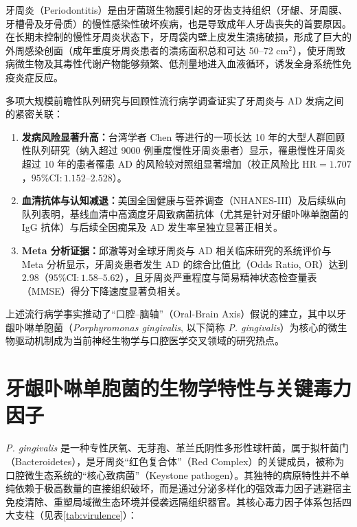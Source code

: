 \documentclass[12pt,a4paper]{ctexart}
\begin{document}
牙周炎（Periodontitis）是由牙菌斑生物膜引起的牙齿支持组织（牙龈、牙周膜、牙槽骨及牙骨质）的慢性感染性破坏疾病，也是导致成年人牙齿丧失的首要原因\cite{caocaifang2004}。在长期未控制的慢性牙周炎状态下，牙周袋内壁上皮发生溃疡破损，形成了巨大的外周感染创面（成年重度牙周炎患者的溃疡面积总和可达 50--72 $\text{cm}^2$），使牙周致病微生物及其毒性代谢产物能够频繁、低剂量地进入血液循环，诱发全身系统性免疫炎症反应\cite{zhangjing2017, liyihan2018}。

多项大规模前瞻性队列研究与回顾性流行病学调查证实了牙周炎与 AD 发病之间的紧密关联：
\begin{enumerate}
    \item \textbf{发病风险显著升高：}台湾学者 Chen 等\cite{chen2017}进行的一项长达 10 年的大型人群回顾性队列研究（纳入超过 9000 例重度慢性牙周炎患者）显示，罹患慢性牙周炎超过 10 年的患者罹患 AD 的风险较对照组显著增加（校正风险比 $\text{HR} = 1.707$，$95\%\text{CI}: 1.152\text{--}2.528$）。
    \item \textbf{血清抗体与认知减退：}美国全国健康与营养调查（NHANES-III）及后续纵向队列表明，基线血清中高滴度牙周致病菌抗体（尤其是针对牙龈卟啉单胞菌的 IgG 抗体）与后续全因痴呆及 AD 发生率呈独立显著正相关\cite{beydoun2020}。
    \item \textbf{Meta 分析证据：}邱澈等\cite{qiuche2020}对全球牙周炎与 AD 相关临床研究的系统评价与 Meta 分析显示，牙周炎患者发生 AD 的综合比值比（Odds Ratio, OR）达到 2.98（$95\%\text{CI}: 1.58\text{--}5.62$），且牙周炎严重程度与简易精神状态检查量表（MMSE）得分下降速度显著负相关。
\end{enumerate}

上述流行病学事实推动了“口腔--脑轴”（Oral-Brain Axis）假说的建立，其中以牙龈卟啉单胞菌（\textit{Porphyromonas gingivalis}, 以下简称 \textit{P. gingivalis}）为核心的微生物驱动机制成为当前神经生物学与口腔医学交叉领域的研究热点\cite{olsen2015, zhang2020}。

\section{牙龈卟啉单胞菌的生物学特性与关键毒力因子}

\textit{P. gingivalis} 是一种专性厌氧、无芽孢、革兰氏阴性多形性球杆菌，属于拟杆菌门（Bacteroidetes），是牙周炎“红色复合体”（Red Complex）的关键成员，被称为口腔微生态系统的“核心致病菌”（Keystone pathogen）\cite{caocaifang2004}。其独特的病原特性并不单纯依赖于极高数量的直接组织破坏，而是通过分泌多样化的强效毒力因子逃避宿主免疫清除、重塑局域微生态环境并侵袭远隔组织器官\cite{ren2024}。其核心毒力因子体系包括四大支柱（见表\ref{tab:virulence}）：
\end{document}
